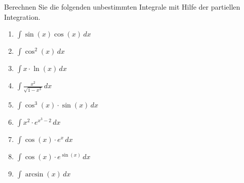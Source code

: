 \begin{ExerciseBlock}
Berechnen Sie die folgenden unbestimmten Integrale mit Hilfe der partiellen Integration.
\begin{enumerate}[label=\alph*)]
	\item $\int \sin(x) \cos(x) \, dx$
	\item $\int \cos^2(x) \, dx$
	\item $\int x \cdot \ln(x) \, dx$
	\item $\int \frac{x^2}{\sqrt{1-x^3}} \, dx$
	\item $\int \cos^3(x) \cdot \sin(x) \, dx$
	\item $\int x^2 \cdot e^{x^3-2} \, dx$
	\item $\int \cos(x) \cdot e^x \, dx$
	\item $\int \cos(x) \cdot e^{\sin(x)}\, dx$
	\item $\int \arcsin(x) \, dx$
\end{enumerate}

\end{ExerciseBlock}

